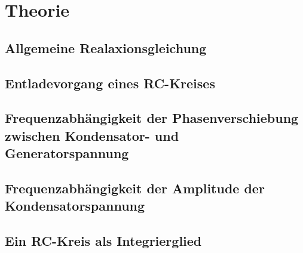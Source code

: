 \section{Theorie}
\label{sec:Theorie}


\subsection{Allgemeine Realaxionsgleichung}
\subsection{Entladevorgang eines RC-Kreises}
\subsection{Frequenzabhängigkeit der Phasenverschiebung zwischen Kondensator- und Generatorspannung}
\subsection{Frequenzabhängigkeit der Amplitude der Kondensatorspannung}
\subsection{Ein RC-Kreis als Integrierglied}